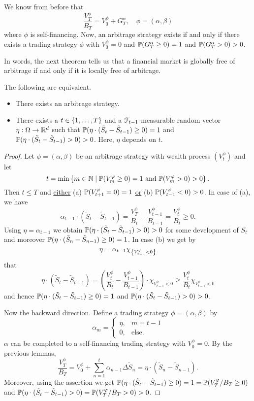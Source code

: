 \documentclass[12pt]{amsart}
\begin{document}
We know from before that \[
    \frac{V_T^\phi}{B_T} = V_0^\phi + G_T^\alpha, \quad \phi = (\alpha, \beta)
\]
where \(\phi\) is self-financing. Now, an arbitrage strategy exists if and only if there exists a trading strategy \(\phi\) with \(V_0^\phi = 0\) and \(\P(G_T^\alpha \geq 0) = 1\) and \(\P(G_T^\alpha > 0) > 0\).

In words, the next theorem tells us that a financial market is globally free of arbitrage if and only if it is locally free of arbitrage.

\begin{theorem}{}{}{}
    The following are equivalent.
    \begin{itemize}
        \item There exists an arbitrage strategy.
        \item There exists a \(t \in \set{1, \dots, T}\) and a \(\cF_{t-1}\)-measurable random vector \(\eta: \Omega \to \R^{d}\) such that \(\P(\eta \cdot (\tilde{S}_t - \tilde{S}_{t-1}) \geq 0) = 1\) and \(\P(\eta \cdot (\tilde{S}_t - \tilde{S}_{t-1}) > 0) > 0\). Here, \(\eta\) depends on \(t\).
    \end{itemize}
\end{theorem}
\begin{proof}
    Let \(\phi = (\alpha, \beta)\) be an arbitrage strategy with wealth process \((V_t^\phi)\) and let \[
        t = \min\set{m \in \N \mid \P(V_m^\phi \geq 0) = 1 \text{ and } \P(V_m^\phi > 0) > 0}.
    \]
    Then \(t \leq T\) and \underline{either} (a) \(\P(V_{t+1}^\phi = 0) = 1\) \underline{or} (b) \(\P(V_{t-1}^\phi < 0) > 0\). In case of (a), we have \[
        \alpha_{t-1} \cdot (\tilde{S}_t - \tilde{S}_{t-1}) = \frac{V_T^\phi}{B_t} - \frac{V_{t-1}^\phi}{B_{t-1}} = \frac{V_t^\phi}{B_t} \geq 0.
    \]
    Using \(\eta = \alpha_{t-1}\) we obtain \(\P(\eta \cdot (\tilde{S}_t - \tilde{S}_{t-1}) > 0) > 0\) for some development of \(S_t\) and moreover \(\P(\eta \cdot (\tilde{S}_n - \tilde{S}_{n-1}) \geq 0) = 1\). In case (b) we get by \[
        \eta = \alpha_{t-1} \chi_{\set{V_{t-1}^\phi < 0}}
    \]
    that \[
        \eta \cdot (\tilde{S}_t - \tilde{S}_{t-1}) = \left(\frac{V_t^\phi}{B_t} - \frac{V_{t-1}^\phi}{B_{t-1}}\right) \cdot \chi_{V_{t-1}^\phi < 0} \geq \frac{V_t^\phi}{B_t} \chi_{V_{t-1}^\phi < 0}
    \]
    and hence \(\P(\eta \cdot (\tilde{S}_t - \tilde{S}_{t-1}) \geq 0) = 1\) and \(\P(\eta \cdot (\tilde{S}_t - \tilde{S}_{t-1}) > 0) > 0\).

    Now the backward direction. Define a trading strategy \(\phi = (\alpha, \beta)\) by \[
        \alpha_m = \begin{cases}
            \eta, &m=t-1\\
            0, &\text{else}.
        \end{cases}
    \]
    \(\alpha\) can be completed to a self-financing trading strategy  with \(V_0^\phi = 0\). By the previous lemmas, \[
        \frac{V_T^\phi}{B_T} = V_0^\phi + \sum_{n=1}^t \alpha_{n-1}\Delta \tilde{S}_n = \eta \cdot (\tilde{S}_n - \tilde{S}_{n-1}).
    \]
    Moreover, using the assertion we get \(\P(\eta \cdot (\tilde{S}_t - \tilde{S}_{t-1}) \geq 0) = 1 = \P(V_T^\phi/B_T \geq 0)\) and \(\P(\eta \cdot (\tilde{S}_t - \tilde{S}_{t-1}) > 0) = \P(V_T^\phi/B_T > 0) > 0\).
\end{proof}
\end{document}
